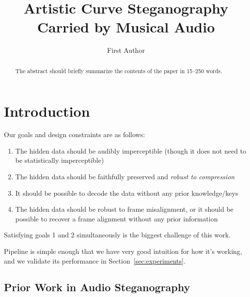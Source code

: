 \documentclass[runningheads]{llncs}
\begin{document}
%
\title{Artistic Curve Steganography Carried by Musical Audio}
%
%
\author{First Author}
%
%
%
\maketitle              %
%
\begin{abstract}
The abstract should briefly summarize the contents of the paper in
15--250 words.

\end{abstract}
%
%
%
\section{Introduction}



Our goals and design constraints are as follows:
\begin{enumerate}
    \item The hidden data should be audibly imperceptible (though it does not need to be statistically imperceptible)
    \item The hidden data should be faithfully preserved and {\em robust to compression}
    \item It should be possible to decode the data without any prior knowledge/keys
    \item The hidden data should be robust to frame misalignment, or it should be possible to recover a frame alignment without any prior information
\end{enumerate}

Satisfying goals 1 and 2 simultaneously is the biggest challenge of this work.

Pipeline is simple enough that we have very good intuition for how it's working, and we validate its performance in Section~\ref{sec:experiments}.


\subsection{Prior Work in Audio Steganography}
\end{document}
